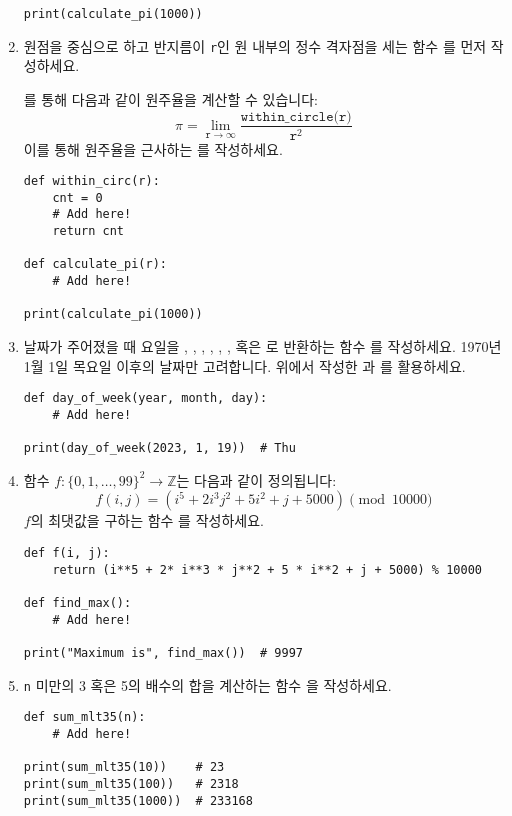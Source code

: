 \documentclass[../main.tex]{subfiles}
\begin{document}
\begin{enumerate}
\begin{verbatim}
print(calculate_pi(1000))
\end{verbatim}

\item 원점을 중심으로 하고 반지름이 \verb/r/인 원 내부의 정수 격자점을 세는 함수 를 먼저 작성하세요.

  를 통해 다음과 같이 원주율을 계산할 수 있습니다:
\[
\pi = \lim_{\texttt{r} \rightarrow \infty} \frac{\texttt{within\_circle(r)}}{\texttt{r}^2}
\]
이를 통해 원주율을 근사하는 를 작성하세요.
\begin{verbatim}
def within_circ(r):
    cnt = 0
    # Add here!
    return cnt

def calculate_pi(r):
    # Add here!

print(calculate_pi(1000))
\end{verbatim}

\item 날짜가 주어졌을 때 요일을 , , , , , , 혹은 로 반환하는 함수 를 작성하세요.
  1970년 1월 1일 목요일 이후의 날짜만 고려합니다.
  위에서 작성한 과 를 활용하세요.
\begin{verbatim}
def day_of_week(year, month, day):
    # Add here!

print(day_of_week(2023, 1, 19))  # Thu
\end{verbatim}

\item 함수 $f: \{0, 1, \dots, 99\}^2 \rightarrow \mathbb{Z}$는 다음과 같이 정의됩니다:
\[
f(i, j) = \left(i^5 + 2i^3j^2 + 5i^2 + j + 5000\right) \pmod{10000}
\]
$f$의 최댓값을 구하는 함수 를 작성하세요.
\begin{verbatim}
def f(i, j):
    return (i**5 + 2* i**3 * j**2 + 5 * i**2 + j + 5000) % 10000

def find_max():
    # Add here!

print("Maximum is", find_max())  # 9997
\end{verbatim}

\item \verb/n/ 미만의 3 혹은 5의 배수의 합을 계산하는 함수 을 작성하세요.
\begin{verbatim}
def sum_mlt35(n):
    # Add here!

print(sum_mlt35(10))    # 23
print(sum_mlt35(100))   # 2318
print(sum_mlt35(1000))  # 233168
\end{verbatim}


\end{enumerate}
\end{document}
